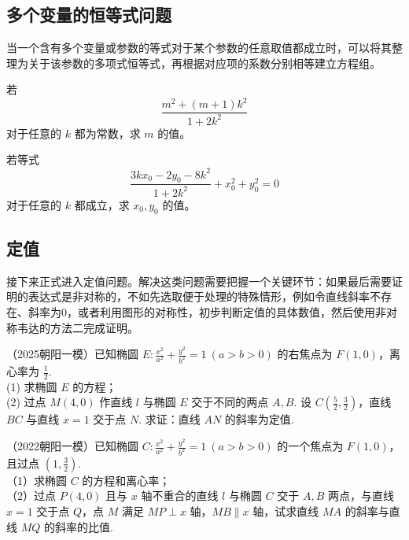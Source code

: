 \subsection{多个变量的恒等式问题}

当一个含有多个变量或参数的等式对于某个参数的任意取值都成立时，可以将其整理为关于该参数的多项式恒等式，再根据对应项的系数分别相等建立方程组。

\begin{tcolorbox}[
  enhanced,
  breakable,
  title={问题引入},
  colback=structurecolor!5,
  colframe=structurecolor,
  colbacktitle=structurecolor,
  coltitle=white,
  fonttitle=\bfseries,
  boxrule=0.5pt,
  arc=1mm,
  left=8pt,
  right=8pt,
  top=6pt,
  bottom=6pt
]
若
\[
\frac{m^2+(m+1)k^2}{1+2k^2}
\]
对于任意的 \(k\) 都为常数，求 \(m\) 的值。
\end{tcolorbox}

\begin{tcolorbox}[
  enhanced,
  breakable,
  title={问题引入},
  colback=structurecolor!5,
  colframe=structurecolor,
  colbacktitle=structurecolor,
  coltitle=white,
  fonttitle=\bfseries,
  boxrule=0.5pt,
  arc=1mm,
  left=8pt,
  right=8pt,
  top=6pt,
  bottom=6pt
]
若等式
\[
\frac{3kx_0-2y_0-8k^2}{1+2k^2}+x_0^2+y_0^2=0
\]
对于任意的 \(k\) 都成立，求 \(x_0,y_0\) 的值。
\end{tcolorbox}

\subsection{定值}
接下来正式进入定值问题。解决这类问题需要把握一个关键环节：如果最后需要证明的表达式是非对称的，不如先选取便于处理的特殊情形，例如令直线斜率不存在、斜率为$0$，或者利用图形的对称性，初步判断定值的具体数值，然后使用非对称韦达的方法二完成证明。




\begin{example} %
（2025朝阳一模）已知椭圆 $E:\frac{x^{2}}{a^{2}}+\frac{y^{2}}{b^{2}}=1\ (a>b>0)$ 的右焦点为 $F(1,0)$，离心率为 $\frac{1}{2}$.\\
(1) 求椭圆 $E$ 的方程；\\
(2) 过点 $M(4,0)$ 作直线 $l$ 与椭圆 $E$ 交于不同的两点 $A,B$. 设 $C\left(\frac{5}{2},\frac{3}{2}\right)$，直线 $BC$ 与直线 $x=1$ 交于点 $N$. 求证：直线 $AN$ 的斜率为定值.
\end{example}
\begin{example} %
（2022朝阳一模）已知椭圆 $C:\frac{x^2}{a^2}+\frac{y^2}{b^2}=1\ (a>b>0)$ 的一个焦点为 $F(1,0)$，且过点 $\left(1,\frac{3}{2}\right)$.\\
（1）求椭圆 $C$ 的方程和离心率；\\
（2）过点 $P(4,0)$ 且与 $x$ 轴不重合的直线 $l$ 与椭圆 $C$ 交于 $A,B$ 两点，与直线 $x=1$ 交于点 $Q$，点 $M$ 满足 $MP\perp x$ 轴，$MB\parallel x$ 轴，试求直线 $MA$ 的斜率与直线 $MQ$ 的斜率的比值.
\end{example}

